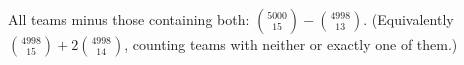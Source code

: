 All teams minus those containing both: $\boxed{\binom{5000}{15}-\binom{4998}{13}}$. (Equivalently $\binom{4998}{15}+2\binom{4998}{14}$, counting teams with neither or exactly one of them.)
